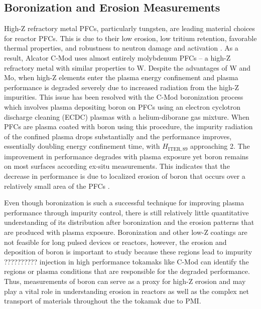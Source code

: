 \documentclass[final,3p,times,twocolumn]{elsarticle}
\begin{document}
\subsection{Boronization and Erosion Measurements}
\label{sec:BZNOverview}
High-Z refractory metal PFCs, particularly tungsten, are leading material choices for reactor PFCs. This is due to their low erosion, low tritium retention, favorable thermal properties, and robustness to neutron damage and activation \cite{WWoBoronization}. As a result, Alcator C-Mod uses almost entirely molybdenum PFCs -- a high-Z refractory metal with similar properties to W.  Despite the advantages of W and Mo, when high-Z elements enter the plasma energy confinement and plasma performance is degraded severely due to increased radiation from the high-Z impurities. %
This issue has been resolved with the C-Mod boronization process which involves plasma depositing boron on PFCs using an electron cyclotron discharge cleaning (ECDC) plasmas with a helium-diborane gas mixture. %
When PFCs are plasma coated with boron using this procedure, the impurity radiation of the confined plasma drops substantially and the performance improves, essentially doubling energy confinement time, with $H_\mathrm{ITER,89}$ approaching 2.%
The improvement in performance degrades with plasma exposure yet boron remains on most surfaces according ex-situ measurements. This indicates that the decrease in performance is due to localized erosion of boron that occurs over a relatively small area of the PFCs \cite{WWoBoronization}.

Even though boronization is such a successful technique for improving plasma performance through impurity control, there is still relatively little quantitative understanding of its distribution after boronization and the erosion patterns that are produced with plasma exposure. Boronization and other low-Z coatings are not feasible for long pulsed devices or reactors, however, the erosion and deposition of boron is important to study because these regions lead to impurity ?????????? injection in high performance tokamaks like C-Mod can identify the regions or plasma conditions that are responsible for the degraded performance.  Thus, measurements of boron can serve as a proxy for high-Z erosion and may play a vital role in understanding erosion in reactors as well as the complex net transport of materials throughout the the tokamak due to PMI.
\end{document}

